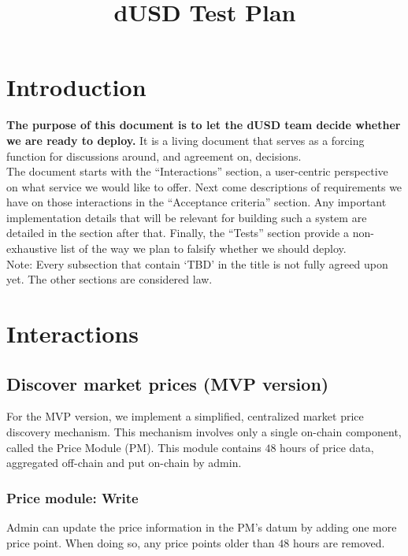 \documentclass{article} %
\title{dUSD Test Plan}
\begin{document}
\maketitle

\section{Introduction}

\textbf{The purpose of this document is to let the dUSD team decide whether we are ready to deploy.}
It is a living document that serves as a forcing function for discussions
around, and agreement on, decisions. \\

The document starts with the ``Interactions'' section, a user-centric
perspective on what service we would like to offer.
Next come descriptions of requirements we have on those interactions in the
``Acceptance criteria'' section.
Any important implementation details that will be relevant for building such a
system are detailed in the section after that.
Finally, the ``Tests'' section provide a non-exhaustive list of the way we plan
to falsify whether we should deploy. \\

Note: Every subsection that contain `TBD' in the title is not fully agreed upon
yet.
The other sections are considered law.

\section{Interactions}

\subsection{Discover market prices (MVP version)}

For the MVP version, we implement a simplified, centralized market price
discovery mechanism.
This mechanism involves only a single on-chain component, called the Price
Module (PM).
This module contains $48$ hours of price data, aggregated off-chain and put
on-chain by admin.

\subsubsection{Price module: Write}

Admin can update the price information in the PM's datum by adding one more
price point.
When doing so, any price points older than $48$ hours are removed.
\end{document}
